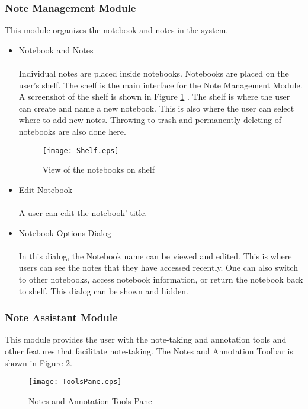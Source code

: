 \subsubsection{Note Management Module}
\label{sec:notemanagementmodule}

This module organizes the notebook and notes in the system.

\begin{itemize}
\item Notebook and Notes
\\\\Individual notes are placed inside notebooks. Notebooks are placed on the user's shelf. The shelf is the main interface for the Note Management Module. A screenshot of the shelf is shown in Figure \ref{fig:shelf} . The shelf is where the user can create and name a new notebook. This is also where the user can select where to add new notes. Throwing to trash and permanently deleting of notebooks are also done here.

\begin{figure}[htbp!]
   \centering
   \texttt{[image: Shelf.eps]}
   \caption{View of the notebooks on shelf}
   \label{fig:shelf}
\end{figure}

\item Edit Notebook
\\\\A user can edit the notebook' title.
\item Notebook Options Dialog
\\\\In this dialog, the Notebook name can be viewed and edited. This is where users can see the notes that they have accessed recently. One can also switch to other notebooks, access notebook information, or return the notebook back to shelf. This dialog can be shown and hidden.
\end{itemize}

\subsubsection{Note Assistant Module}
\label{sec:noteassistantmodule}

This module provides the user with the note-taking and annotation tools and other features that facilitate note-taking. The Notes and Annotation Toolbar is shown in Figure \ref{fig:noteandannotationtoolspane}.

\begin{figure}[htbp!]
   \centering   
   \texttt{[image: ToolsPane.eps]} 
   \caption{Notes and Annotation Tools Pane}
   \label{fig:noteandannotationtoolspane}
\end{figure}

